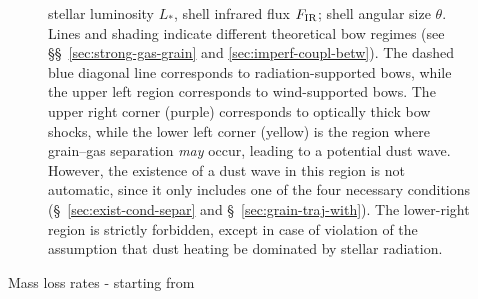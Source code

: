 \begin{figure}
{    stellar luminosity \(L_*\), shell infrared flux \(F_{\text{IR}}\); shell
    angular size \(\theta\).  Lines and shading indicate different
    theoretical bow regimes (see \S\S~\ref{sec:strong-gas-grain} and
    \ref{sec:imperf-coupl-betw}).  The dashed blue diagonal line
    corresponds to radiation-supported bows, while the upper left
    region corresponds to wind-supported bows.  The upper right corner
    (purple) corresponds to optically thick bow shocks, while the
    lower left corner (yellow) is the region where grain--gas
    separation \textit{may} occur, leading to a potential dust wave.
    However, the existence of a dust wave in this region is not
    automatic, since it only includes one of the four necessary
    conditions (\S~\ref{sec:exist-cond-separ} and
    \S~\ref{sec:grain-traj-with}). The lower-right region is strictly
    forbidden, except in case of violation of the assumption that dust
    heating be dominated by stellar radiation. }
  \label{fig:All-sources-eta-tau}
\end{figure}



Mass loss rates - starting from \citet{Kobulnicky:2010a}

